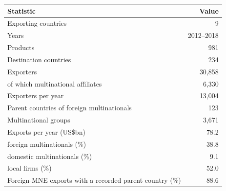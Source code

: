 \begin{tabular}{lr}
\toprule
Statistic & Value \\
\midrule
Exporting countries & 9 \\
Years & 2012--2018 \\
Products & 981 \\
Destination countries & 234 \\
Exporters & 30,858 \\
\quad of which multinational affiliates & 6,330 \\
Exporters per year & 13,004 \\
Parent countries of foreign multinationals & 123 \\
Multinational groups & 3,671 \\
\midrule
Exports per year (US\$bn) & 78.2 \\
\quad foreign multinationals (\%) & 38.8 \\
\quad domestic multinationals (\%) & 9.1 \\
\quad local firms (\%) & 52.0 \\
Foreign-MNE exports with a recorded parent country (\%) & 88.6 \\
\bottomrule
\end{tabular}
